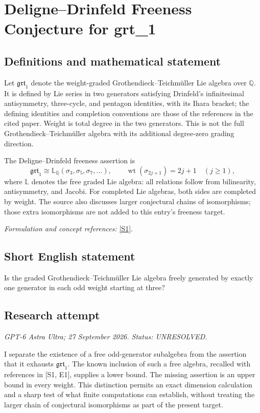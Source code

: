 \documentclass[11pt]{article}
\begin{document}
\section*{\texorpdfstring{Deligne–Drinfeld Freeness Conjecture for grt\_1}{Deligne–Drinfeld Freeness Conjecture for grt\_1}}\label{448}
\subsection{Definitions and mathematical statement}
Let $\mathfrak{grt}_1$ denote the weight-graded Grothendieck--Teichm\"uller Lie algebra over ${\mathbb{Q}}$. It is defined by Lie series in two generators satisfying Drinfeld's infinitesimal antisymmetry, three-cycle, and pentagon identities, with its Ihara bracket; the defining identities and completion conventions are those of the references in the cited paper. Weight is total degree in the two generators. This is not the full Grothendieck--Teichm\"uller algebra with its additional degree-zero grading direction.

The Deligne--Drinfeld freeness assertion is
\[
 \mathfrak{grt}_1\cong
 \mathbb L_{{\mathbb{Q}}}(\sigma_3,\sigma_5,\sigma_7,\ldots),
 \qquad \operatorname{wt}(\sigma_{2j+1})=2j+1\quad(j\ge1),
\]
where $\mathbb L$ denotes the free graded Lie algebra: all relations follow from bilinearity, antisymmetry, and Jacobi. For completed Lie algebras, both sides are completed by weight. The source also discusses larger conjectural chains of isomorphisms; those extra isomorphisms are not added to this entry's freeness target.
\par\smallskip\textit{Formulation and concept references:} \href{https://arxiv.org/html/2508.08081}{[S1]}.

\subsection{Short English statement}
Is the graded Grothendieck--Teichm\"uller Lie algebra freely generated by exactly one generator in each odd weight starting at three?
\subsection{Research attempt}
\textit{GPT-6 Astra Ultra; 27 September 2026. Status: UNRESOLVED.}

I separate the existence of a free odd-generator subalgebra from the
assertion that it exhausts $\mathfrak{grt}_1$. The known inclusion of
such a free algebra, recalled with references in [S1, E1], supplies a
lower bound. The missing assertion is an upper bound in every weight.
This distinction permits an exact dimension calculation and a sharp test
of what finite computations can establish, without treating the larger
chain of conjectural isomorphisms as part of the present target.
\end{document}

